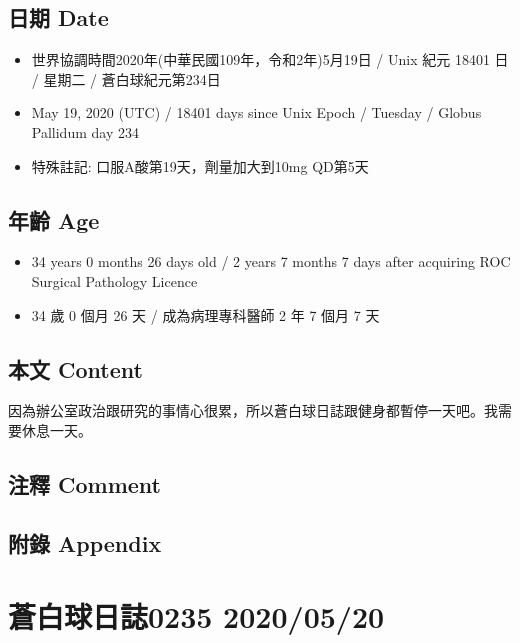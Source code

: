 \documentclass[a5paper, 11pt
]{book}
\providecommand{\tightlist}{%
  \setlength{\itemsep}{0pt}\setlength{\parskip}{0pt}}
\begin{document}
\hypertarget{ux65e5ux671f-date-79}{%
\subsection{日期 Date}\label{ux65e5ux671f-date-79}}

\begin{itemize}
\tightlist
\item
  世界協調時間2020年(中華民國109年，令和2年)5月19日 / Unix 紀元 18401 日
  / 星期二 / 蒼白球紀元第234日
\item
  May 19, 2020 (UTC) / 18401 days since Unix Epoch / Tuesday / Globus
  Pallidum day 234
\item
  特殊註記: 口服A酸第19天，劑量加大到10mg QD第5天
\end{itemize}

\hypertarget{ux5e74ux9f61-age-79}{%
\subsection{年齡 Age}\label{ux5e74ux9f61-age-79}}

\begin{itemize}
\tightlist
\item
  34 years 0 months 26 days old / 2 years 7 months 7 days after
  acquiring ROC Surgical Pathology Licence
\item
  34 歲 0 個月 26 天 / 成為病理專科醫師 2 年 7 個月 7 天
\end{itemize}

\hypertarget{ux672cux6587-content-79}{%
\subsection{本文 Content}\label{ux672cux6587-content-79}}

因為辦公室政治跟研究的事情心很累，所以蒼白球日誌跟健身都暫停一天吧。我需要休息一天。

\hypertarget{ux6ce8ux91cb-comment-79}{%
\subsection{注釋 Comment}\label{ux6ce8ux91cb-comment-79}}

\hypertarget{ux9644ux9304-appendix-79}{%
\subsection{附錄 Appendix}\label{ux9644ux9304-appendix-79}}

\hypertarget{ux84bcux767dux7403ux65e5ux8a8c0235-20200520}{%
\section{蒼白球日誌0235
2020/05/20}\label{ux84bcux767dux7403ux65e5ux8a8c0235-20200520}}
\end{document}
